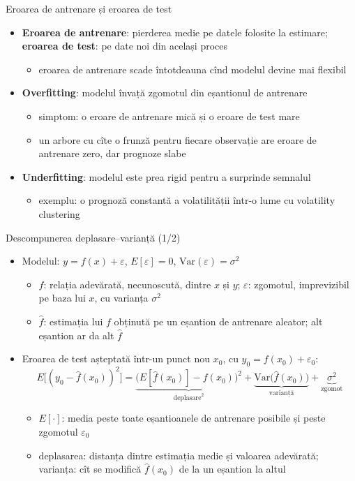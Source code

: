 \begin{frame}{Eroarea de antrenare și eroarea de test}
\itemsize{\small}
\begin{itemize}
    \item \textbf{Eroarea de antrenare}: pierderea medie pe datele folosite la estimare; \textbf{eroarea de test}: pe date noi din același proces
    \begin{itemize}
        \item eroarea de antrenare scade întotdeauna cînd modelul devine mai flexibil
    \end{itemize}
    \item \textbf{Overfitting}: modelul învață zgomotul din eșantionul de antrenare
    \begin{itemize}
        \item simptom: o eroare de antrenare mică și o eroare de test mare
        \item un arbore cu cîte o frunză pentru fiecare observație are eroare de antrenare zero, dar prognoze slabe
    \end{itemize}
    \item \textbf{Underfitting}: modelul este prea rigid pentru a surprinde semnalul
    \begin{itemize}
        \item exemplu: o prognoză constantă a volatilității într-o lume cu volatility clustering
    \end{itemize}
\end{itemize}
\end{frame}

\begin{frame}{Descompunerea deplasare--varianță (1/2)}
\itemsize{\small}
\begin{itemize}
    \item Modelul: $y = f(x) + \varepsilon$, $E[\varepsilon] = 0$, $\mathrm{Var}(\varepsilon) = \sigma^2$
    \begin{itemize}
        \item $f$: relația adevărată, necunoscută, dintre $x$ și $y$; $\varepsilon$: zgomotul, imprevizibil pe baza lui $x$, cu varianța $\sigma^2$
        \item $\hat f$: estimația lui $f$ obținută pe un eșantion de antrenare aleator; alt eșantion ar da alt $\hat f$
    \end{itemize}
    \item Eroarea de test așteptată într-un punct nou $x_0$, cu $y_0 = f(x_0) + \varepsilon_0$: \[ E\big[(y_0 - \hat f(x_0))^2\big] = \underbrace{\big(E[\hat f(x_0)] - f(x_0)\big)^2}_{\text{deplasare}^2} + \underbrace{\mathrm{Var}\big(\hat f(x_0)\big)}_{\text{varianță}} + \underbrace{\sigma^2}_{\text{zgomot}} \]
    \begin{itemize}
        \item $E[\cdot]$: media peste toate eșantioanele de antrenare posibile și peste zgomotul $\varepsilon_0$
        \item deplasarea: distanța dintre estimația medie și valoarea adevărată; varianța: cît se modifică $\hat f(x_0)$ de la un eșantion la altul
    \end{itemize}
\end{itemize}
\end{frame}

